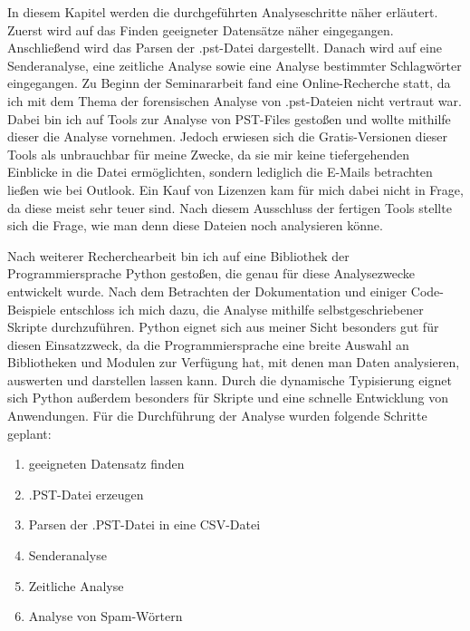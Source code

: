 \noindent In diesem Kapitel werden die durchgeführten Analyseschritte näher erläutert. Zuerst wird auf das Finden geeigneter Datensätze näher eingegangen. Anschließend wird das Parsen der .pst-Datei dargestellt. Danach wird auf eine Senderanalyse, eine zeitliche Analyse sowie eine Analyse bestimmter Schlagwörter eingegangen. Zu Beginn der Seminararbeit fand eine Online-Recherche statt, da ich mit dem Thema der forensischen Analyse von .pst-Dateien nicht vertraut war. Dabei bin ich auf Tools zur Analyse von PST-Files gestoßen und wollte mithilfe dieser die Analyse vornehmen. Jedoch erwiesen sich die Gratis-Versionen dieser Tools als unbrauchbar für meine Zwecke, da sie mir keine tiefergehenden Einblicke in die Datei ermöglichten, sondern lediglich die E-Mails betrachten ließen wie bei Outlook. Ein Kauf von Lizenzen kam für mich dabei nicht in Frage, da diese meist sehr teuer sind. Nach diesem Ausschluss der fertigen Tools stellte sich die Frage, wie man denn diese Dateien noch analysieren könne. \smallskip


\noindent Nach weiterer Recherchearbeit bin ich auf eine Bibliothek der Programmiersprache Python gestoßen, die genau für diese Analysezwecke entwickelt wurde. Nach dem Betrachten der Dokumentation und einiger Code-Beispiele entschloss ich mich dazu, die Analyse mithilfe selbstgeschriebener Skripte durchzuführen. Python eignet sich aus meiner Sicht besonders gut für diesen Einsatzzweck, da die Programmiersprache eine breite Auswahl an Bibliotheken und Modulen zur Verfügung hat, mit denen man Daten analysieren, auswerten und darstellen lassen kann. Durch die dynamische Typisierung eignet sich Python außerdem besonders für Skripte und eine schnelle Entwicklung von Anwendungen. Für die Durchführung der Analyse wurden folgende Schritte geplant:

\begin{enumerate}
    \item geeigneten Datensatz finden
    \item .PST-Datei erzeugen 
    \item Parsen der .PST-Datei in eine CSV-Datei
    \item Senderanalyse
    \item Zeitliche Analyse
    \item Analyse von Spam-Wörtern
\end{enumerate}